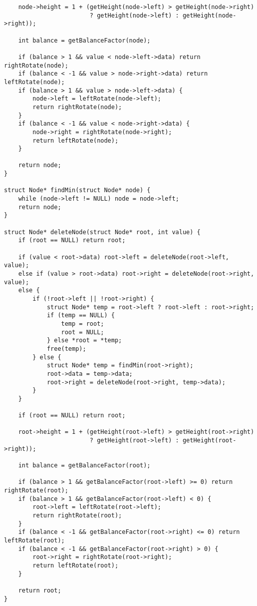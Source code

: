 \documentclass[12pt,a4paper]{article}
\begin{document}
\begin{lstlisting}
    node->height = 1 + (getHeight(node->left) > getHeight(node->right)
                        ? getHeight(node->left) : getHeight(node->right));

    int balance = getBalanceFactor(node);

    if (balance > 1 && value < node->left->data) return rightRotate(node);
    if (balance < -1 && value > node->right->data) return leftRotate(node);
    if (balance > 1 && value > node->left->data) {
        node->left = leftRotate(node->left);
        return rightRotate(node);
    }
    if (balance < -1 && value < node->right->data) {
        node->right = rightRotate(node->right);
        return leftRotate(node);
    }

    return node;
}

struct Node* findMin(struct Node* node) {
    while (node->left != NULL) node = node->left;
    return node;
}

struct Node* deleteNode(struct Node* root, int value) {
    if (root == NULL) return root;

    if (value < root->data) root->left = deleteNode(root->left, value);
    else if (value > root->data) root->right = deleteNode(root->right, value);
    else {
        if (!root->left || !root->right) {
            struct Node* temp = root->left ? root->left : root->right;
            if (temp == NULL) {
                temp = root;
                root = NULL;
            } else *root = *temp;
            free(temp);
        } else {
            struct Node* temp = findMin(root->right);
            root->data = temp->data;
            root->right = deleteNode(root->right, temp->data);
        }
    }

    if (root == NULL) return root;

    root->height = 1 + (getHeight(root->left) > getHeight(root->right)
                        ? getHeight(root->left) : getHeight(root->right));

    int balance = getBalanceFactor(root);

    if (balance > 1 && getBalanceFactor(root->left) >= 0) return rightRotate(root);
    if (balance > 1 && getBalanceFactor(root->left) < 0) {
        root->left = leftRotate(root->left);
        return rightRotate(root);
    }
    if (balance < -1 && getBalanceFactor(root->right) <= 0) return leftRotate(root);
    if (balance < -1 && getBalanceFactor(root->right) > 0) {
        root->right = rightRotate(root->right);
        return leftRotate(root);
    }

    return root;
}


\end{lstlisting}
\end{document}
